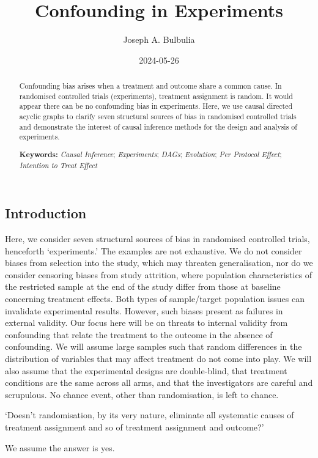 \documentclass[
  single column]{article}
\title{Confounding in Experiments}
\author{Joseph A. Bulbulia}
\affil{%
             \small{     Victoria University of Wellington, New Zealand
          ORCID \textcolor[HTML]{A6CE39}{\aiOrcid} ~0000-0002-5861-2056 }
              }
\date{2024-05-26}
\begin{document}
\maketitle
\begin{abstract}
Confounding bias arises when a treatment and outcome share a common
cause. In randomised controlled trials (experiments), treatment
assignment is random. It would appear there can be no confounding bias
in experiments. Here, we use causal directed acyclic graphs to clarify
seven structural sources of bias in randomised controlled trials and
demonstrate the interest of causal inference methods for the design and
analysis of experiments.

\textbf{Keywords:} \emph{Causal Inference}; \emph{Experiments};
\emph{DAGs}; \emph{Evolution}; \emph{Per Protocol Effect};
\emph{Intention to Treat Effect}
\end{abstract}

\subsection{Introduction}\label{introduction}

Here, we consider seven structural sources of bias in randomised
controlled trials, henceforth `experiments.' The examples are not
exhaustive. We do not consider biases from selection into the study,
which may threaten generalisation, nor do we consider censoring biases
from study attrition, where population characteristics of the restricted
sample at the end of the study differ from those at baseline concerning
treatment effects. Both types of sample/target population issues can
invalidate experimental results. However, such biases present as
failures in external validity. Our focus here will be on threats to
internal validity from confounding that relate the treatment to the
outcome in the absence of confounding. We will assume large samples such
that random differences in the distribution of variables that may affect
treatment do not come into play. We will also assume that the
experimental designs are double-blind, that treatment conditions are the
same across all arms, and that the investigators are careful and
scrupulous. No chance event, other than randomisation, is left to
chance.

`Doesn't randomisation, by its very nature, eliminate all systematic
causes of treatment assignment and so of treatment assignment and
outcome?'

We assume the answer is yes.
\end{document}
